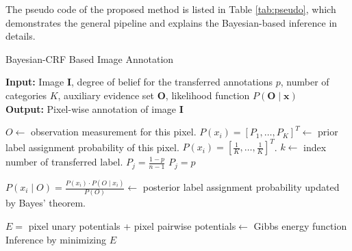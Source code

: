 The pseudo code of the proposed method is listed in Table \ref{tab:pseudo}, which demonstrates the general pipeline and explains the Bayesian-based inference in details. 
\begin{algorithm}
\caption{Bayesian-CRF Based Image Annotation}\label{tab:pseudo}
     \textbf{Input:} Image $\mathbf{I}$, degree of belief for the transferred annotations $p$, number of categories $K$, auxiliary evidence set $\mathbf{O}$, likelihood function $P\left(\mathbf{O}\mid \mathbf{x}\right)$\\
     \textbf{Output:} Pixel-wise annotation of image $\mathbf{I}$
    \begin{algorithmic}[1]
        \State $O \gets$ observation measurement for this pixel.
        \State $P\left(x_i\right) = [P_1,\dots,P_K]^{T} \gets $ prior label assignment probability of this pixel.
         \State $P\left(x_i\right) = [\frac{1}{K},\dots,\frac{1}{K}]^{T}$.
      	\Else        
     	\State $k \gets$ index number of transferred label.
        $P_j = \frac{1-p}{n-1}$
        \Else 
        \State $P_j = p$
        \EndIf
        \EndFor
        
     	\EndIf
    	\State $P\left(x_i\mid O\right) = \frac{P\left(x_i\right)\cdot P\left(O \mid x_i\right)}{P\left(O\right)} \gets $ posterior label assignment probability updated by Bayes' theorem.
      \EndFor
      \State
    \EndProcedure
    
    \State $ E =$ pixel unary potentials + pixel pairwise potentials$\gets$  Gibbs energy function 
    \State Inference by minimizing $E$ 
    \EndProcedure 
    \end{algorithmic}
    \end{algorithm}


